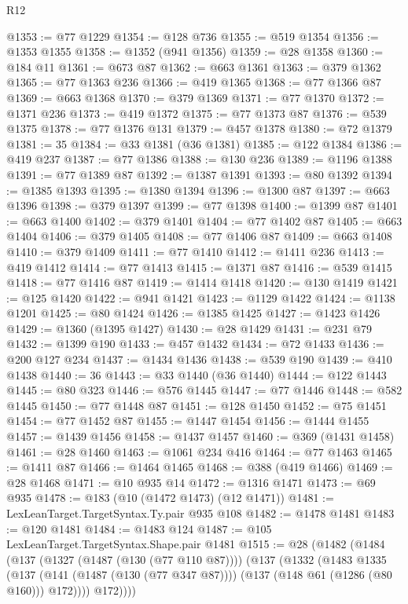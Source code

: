 \begin{lexlean}{R12}
\begin{coremodule}
@1353 := @77 @1229
@1354 := @128 @736
@1355 := @519 @1354
@1356 := @1353 @1355
@1358 := @1352 (@941 @1356)
@1359 := @28 @1358
@1360 := @184 @11
@1361 := @673 @87
@1362 := @663 @1361
@1363 := @379 @1362
@1365 := @77 @1363 @236
@1366 := @419 @1365
@1368 := @77 @1366 @87
@1369 := @663 @1368
@1370 := @379 @1369
@1371 := @77 @1370
@1372 := @1371 @236
@1373 := @419 @1372
@1375 := @77 @1373 @87
@1376 := @539 @1375
@1378 := @77 @1376 @131
@1379 := @457 @1378
@1380 := @72 @1379
@1381 := 35
@1384 := @33 @1381 (@36 @1381)
@1385 := @122 @1384
@1386 := @419 @237
@1387 := @77 @1386
@1388 := @130 @236
@1389 := @1196 @1388
@1391 := @77 @1389 @87
@1392 := @1387 @1391
@1393 := @80 @1392
@1394 := @1385 @1393
@1395 := @1380 @1394
@1396 := @1300 @87
@1397 := @663 @1396
@1398 := @379 @1397
@1399 := @77 @1398
@1400 := @1399 @87
@1401 := @663 @1400
@1402 := @379 @1401
@1404 := @77 @1402 @87
@1405 := @663 @1404
@1406 := @379 @1405
@1408 := @77 @1406 @87
@1409 := @663 @1408
@1410 := @379 @1409
@1411 := @77 @1410
@1412 := @1411 @236
@1413 := @419 @1412
@1414 := @77 @1413
@1415 := @1371 @87
@1416 := @539 @1415
@1418 := @77 @1416 @87
@1419 := @1414 @1418
@1420 := @130 @1419
@1421 := @125 @1420
@1422 := @941 @1421
@1423 := @1129 @1422
@1424 := @1138 @1201
@1425 := @80 @1424
@1426 := @1385 @1425
@1427 := @1423 @1426
@1429 := @1360 (@1395 @1427)
@1430 := @28 @1429
@1431 := @231 @79
@1432 := @1399 @190
@1433 := @457 @1432
@1434 := @72 @1433
@1436 := @200 @127 @234
@1437 := @1434 @1436
@1438 := @539 @190
@1439 := @410 @1438
@1440 := 36
@1443 := @33 @1440 (@36 @1440)
@1444 := @122 @1443
@1445 := @80 @323
@1446 := @576 @1445
@1447 := @77 @1446
@1448 := @582 @1445
@1450 := @77 @1448 @87
@1451 := @128 @1450
@1452 := @75 @1451
@1454 := @77 @1452 @87
@1455 := @1447 @1454
@1456 := @1444 @1455
@1457 := @1439 @1456
@1458 := @1437 @1457
@1460 := @369 (@1431 @1458)
@1461 := @28 @1460
@1463 := @1061 @234 @416
@1464 := @77 @1463
@1465 := @1411 @87
@1466 := @1464 @1465
@1468 := @388 (@419 @1466)
@1469 := @28 @1468
@1471 := @10 @935 @14
@1472 := @1316 @1471
@1473 := @69 @935
@1478 := @183 (@10 (@1472 @1473) (@12 @1471))
@1481 := LexLeanTarget.TargetSyntax.Ty.pair @935 @108
@1482 := @1478 @1481
@1483 := @120 @1481
@1484 := @1483 @124
@1487 := @105 LexLeanTarget.TargetSyntax.Shape.pair @1481
@1515 := @28
    (@1482
      (@1484
        (@137
          (@1327 (@1487 (@130 (@77 @110 @87))))
          (@137
            (@1332
              (@1483
                @1335
                (@137
                  (@141 (@1487 (@130 (@77 @347 @87))))
                  (@137 (@148 @61 (@1286 (@80 @160))) @172))))
            @172))))

\end{coremodule}
\end{lexlean}
